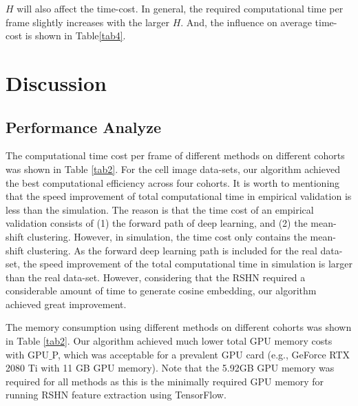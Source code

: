\documentclass[journal,twoside,web]{ieeecolor}
\begin{document}
$H$ will also affect the time-cost. In general, the required computational time per frame slightly increases with the larger $H$. And, the influence on average time-cost is shown in Table\ref{tab4}.


\section{Discussion}
\subsection{Performance Analyze}
The computational time cost per frame of different methods on different cohorts was shown in Table \ref{tab2}. For the cell image data-sets, our algorithm achieved the best computational efficiency across four cohorts. It is worth to mentioning that the speed improvement of total computational time in empirical validation is less than the simulation. The reason is that the time cost of an empirical validation consists of (1) the forward path of deep learning, and (2) the mean-shift clustering. However, in simulation, the time cost only contains the mean-shift clustering. As the forward deep learning path is included for the real data-set, the speed improvement of the total computational time in simulation is larger than the real data-set. However, considering that the RSHN required a considerable amount of time to generate cosine embedding, our algorithm achieved great improvement. 


The memory consumption using different methods on different cohorts was shown in Table \ref{tab2}. Our algorithm achieved much lower total GPU memory costs with GPU$\_$P, which was acceptable for a prevalent GPU card (e.g., GeForce RTX 2080 Ti with 11 GB GPU memory). Note that the 5.92GB GPU memory was required for all methods as this is the minimally required GPU memory for running RSHN feature extraction using TensorFlow.  
\end{document}
